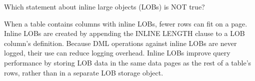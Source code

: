 \documentclass[answers, 11pt]{exam}
\begin{document}
\begin{questions}
\question[1]
Which statement about inline large objects (LOBs) is NOT true?
\begin{choices} 
\choice When a table contains columns with inline LOBs, fewer rows can fit on a page.
\choice Inline LOBs are created by appending the INLINE LENGTH clause to a LOB column's definition.
\choice Because DML operations against inline LOBs are never logged, their use can reduce logging overhead.
\choice Inline LOBs improve query performance by storing LOB data in the same data pages as the rest of a table's rows,
		rather than in a separate LOB storage object.
\end{choices}

\newpage
\addpoints
{}




\end{questions}
\end{document}

